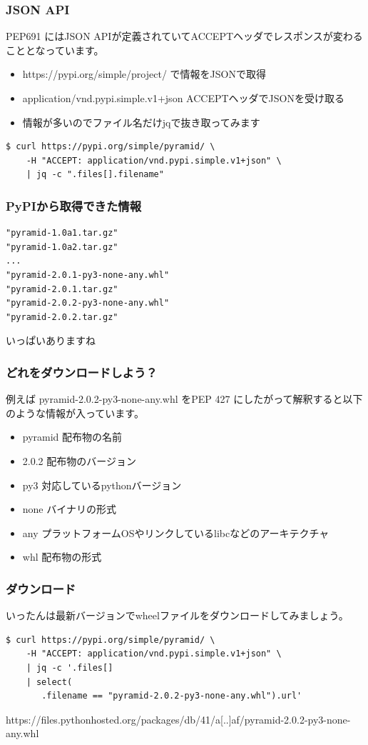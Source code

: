 \documentclass[aspectratio=169]{beamer}
\begin{document}
\begin{frame}[fragile]

\frametitle{JSON API}
PEP691 にはJSON APIが定義されていてACCEPTヘッダでレスポンスが変わることとなっています。

\begin{itemize}
\item https://pypi.org/simple/{project}/ で情報をJSONで取得
\item application/vnd.pypi.simple.v1+json ACCEPTヘッダでJSONを受け取る
\item 情報が多いのでファイル名だけjqで抜き取ってみます
\end{itemize}
\begin{lstlisting}
$ curl https://pypi.org/simple/pyramid/ \
    -H "ACCEPT: application/vnd.pypi.simple.v1+json" \
	| jq -c ".files[].filename"
\end{lstlisting}
\end{frame}


\begin{frame}[fragile]
\frametitle{PyPIから取得できた情報}
\begin{lstlisting}
"pyramid-1.0a1.tar.gz"
"pyramid-1.0a2.tar.gz"
...
"pyramid-2.0.1-py3-none-any.whl"
"pyramid-2.0.1.tar.gz"
"pyramid-2.0.2-py3-none-any.whl"
"pyramid-2.0.2.tar.gz"
\end{lstlisting}
いっぱいありますね
\end{frame}

\begin{frame}
\frametitle{どれをダウンロードしよう？}

例えば pyramid-2.0.2-py3-none-any.whl をPEP 427 にしたがって解釈すると以下のような情報が入っています。

\begin{itemize}
\item pyramid 配布物の名前
\item 2.0.2 配布物のバージョン
\item py3 対応しているpythonバージョン
\item none バイナリの形式
\item any プラットフォームOSやリンクしているlibcなどのアーキテクチャ
\item whl 配布物の形式
\end{itemize}
\end{frame}

\begin{frame}[fragile]
\frametitle{ダウンロード}
いったんは最新バージョンでwheelファイルをダウンロードしてみましょう。
\begin{lstlisting}
$ curl https://pypi.org/simple/pyramid/ \
    -H "ACCEPT: application/vnd.pypi.simple.v1+json" \
	| jq -c '.files[] 
	| select(
       .filename == "pyramid-2.0.2-py3-none-any.whl").url'
\end{lstlisting}
https://files.pythonhosted.org/packages/db/41/a[..]af/pyramid-2.0.2-py3-none-any.whl
\end{frame}
\end{document}
